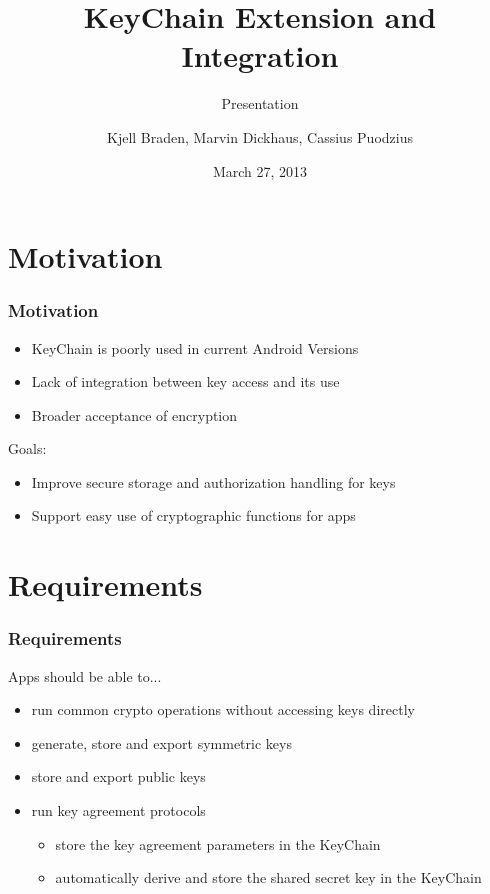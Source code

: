 \documentclass{beamer}
\title{KeyChain Extension and Integration}
\subtitle{Presentation}
\author[Braden, Dickhaus, Puodzius]{Kjell Braden, Marvin Dickhaus, Cassius Puodzius}
\institute{Fachbereich Informatik \\ TU Darmstadt}
\date{March 27, 2013}
\begin{document}
\begin{frame}
	\titlepage
\end{frame}
\begin{frame}
	\tableofcontents
\end{frame}

\section{Motivation}
	\begin{frame}
		\tableofcontents[currentsection]
	\end{frame}
	\begin{frame}
	\frametitle{Motivation}
	\begin{itemize}
		\item KeyChain is poorly used in current Android Versions
		\item Lack of integration between key access and its use
		\item Broader acceptance of encryption %
	\end{itemize}
	Goals:
	\begin{itemize}
		\item Improve secure storage and authorization handling for keys
		\item Support easy use of cryptographic functions for apps
	\end{itemize}	
	\end{frame}

\section{Requirements}
	\begin{frame}
		\tableofcontents[currentsection]
	\end{frame}
	\begin{frame}
	\frametitle{Requirements}
		Apps should be able to...
		\begin{itemize}
			\item run common crypto operations without accessing keys directly
			\item generate, store and export symmetric keys
			\item store and export public keys
			\item run key agreement protocols 
			\begin{itemize}
				\item store the key agreement parameters in the KeyChain
				\item automatically derive and store the shared secret key in the KeyChain
			\end{itemize}
		\end{itemize}
	\end{frame}
\end{document}
